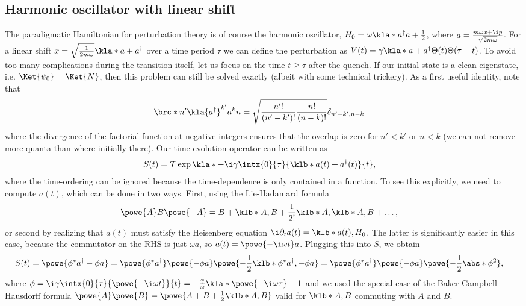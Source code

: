 \documentclass[english, parskip=full]{scrartcl}
\begin{document}
\subsection{Harmonic oscillator with linear shift}
The paradigmatic Hamiltonian for perturbation theory is of course the harmonic oscillator, $H_0=\omega\kla*{a^\dagger a+\frac{1}{2}}$, where $a = \frac{m\omega x + \i p}{\sqrt{2m\omega}}$.
For a linear shift $x = \sqrt{\frac{1}{2m\omega}} \kla*{a + a^\dagger}$ over a time period $\tau$ we can define the perturbation as $V(t) = \gamma \kla*{a+a^\dagger}\Theta(t)\Theta(\tau-t)$.
To avoid too many complications during the transition itself, let us focus on the time $t\ge \tau$ after the quench.
If our initial state is a clean eigenstate, i.e. $\Ket{\psi_0} = \Ket{N}$, then this problem can still be solved exactly (albeit with some technical trickery).
As a first useful identity, note that
\begin{align}
\brc*{n'}{\kla{a^\dagger}^{k'} a^k }{n} &= \sqrt{\frac{n'!}{(n'-k')!} \frac{n!}{(n-k)!}} \delta_{n'-k',n-k}
\end{align}
where the divergence of the factorial function at negative integers ensures that the overlap is zero for $n'<k'$ or $n<k$ (we can not remove more quanta than where initially there).
Our time-evolution operator can be written as
\begin{align}
S(t) &= \mathcal{T} \exp\kla*{-\i \gamma \intx{0}{\tau}{ \klb*{a(t) + a^\dagger(t)} }{t}},
\end{align}
where the time-ordering can be ignored because the time-dependence is only contained in a function.
To see this explicitly, we need to compute $a(t)$, which can be done in two ways.
First, using the Lie-Hadamard formula
\begin{align}
\powe{A} B \powe{-A} &= B + \klb*{A,B} + \frac{1}{2!} \klb*{A,\klb*{A,B}} + \dots,
\end{align}
or second by realizing that $a(t)$ must satisfy the Heisenberg equation $\i\partial_t a(t) = \klb*{a(t),H_0}$.
The latter is significantly easier in this case, because the commutator on the RHS is just $\omega a$, so $a(t) = \powe{-\i\omega t} a$.
Plugging this into $S$, we obtain
\begin{align}
S(t) &= \powe{\phi^\ast a^\dagger - \phi a} = \powe{\phi^\ast a^\dagger} \powe{-\phi a} \powe{-\frac{1}{2} \klb*{\phi^\ast a^\dagger, -\phi a}} = \powe{\phi^\ast a^\dagger} \powe{-\phi a} \powe{-\frac{1}{2} \abs*{\phi}^2},
\end{align}
where $\phi = \i\gamma \intx{0}{\tau}{\powe{-\i\omega t}}{t} = -\frac{\gamma}{\omega} \kla*{\powe{-\i\omega\tau} - 1}$ and we used the special case of the Baker-Campbell-Hausdorff formula $\powe{A}\powe{B} = \powe{A+B+\frac{1}{2}\klb*{A,B}}$ valid for $\klb*{A,B}$ commuting with $A$ and $B$.
\end{document}
